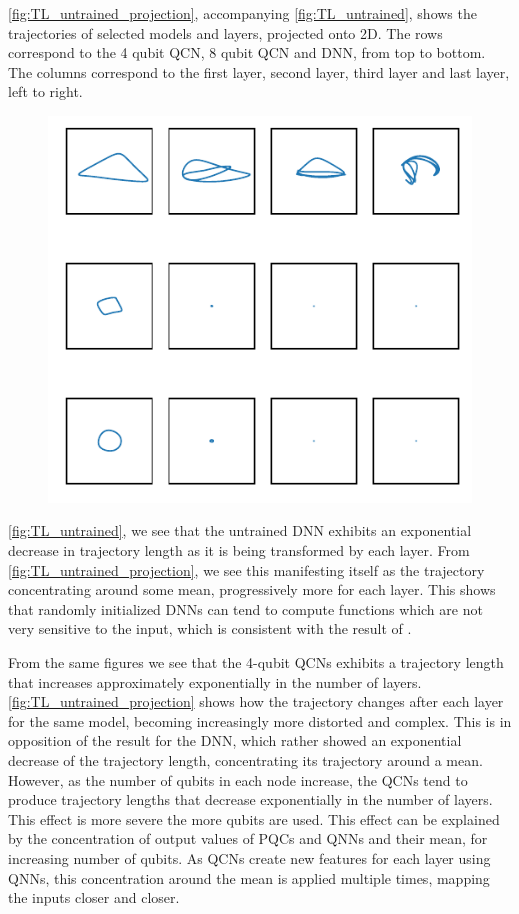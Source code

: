 \autoref{fig:TL_untrained_projection}, accompanying \autoref{fig:TL_untrained}, shows the trajectories of selected models and layers, projected onto 2D. The rows correspond to the 4 qubit QCN, 8 qubit QCN and DNN, from top to bottom. The columns correspond to the first layer, second layer, third layer and last layer, left to right.   

\begin{figure}[htp]
    \centering
    \includegraphics[width=12cm]{latex/figures/TL_untrained_projection.pdf}
    \caption{}
    \label{fig:TL_untrained_projection}
\end{figure}

\autoref{fig:TL_untrained}, we see that the untrained DNN exhibits an exponential decrease in trajectory length as it is being transformed by each layer. From \autoref{fig:TL_untrained_projection}, we see this manifesting itself as the trajectory concentrating around some mean, progressively more for each layer. This shows that randomly initialized DNNs can tend to compute functions which are not very sensitive to the input, which is consistent with the result of \citet{raghu2017expressive}. 

From the same figures we see that the 4-qubit QCNs exhibits a trajectory length that increases approximately exponentially in the number of layers. \autoref{fig:TL_untrained_projection} shows how the trajectory changes after each layer for the same model, becoming increasingly more distorted and complex. This is in opposition of the result for the DNN, which rather showed an exponential decrease of the trajectory length, concentrating its trajectory around a mean. However, as the number of qubits in each node increase, the QCNs tend to produce trajectory lengths that decrease exponentially in the number of layers. This effect is more severe the more qubits are used. This effect can be explained by the concentration of output values of PQCs and QNNs and their mean, for increasing number of qubits. As QCNs create new features for each layer using QNNs, this concentration around the mean is applied multiple times, mapping the inputs closer and closer. 

